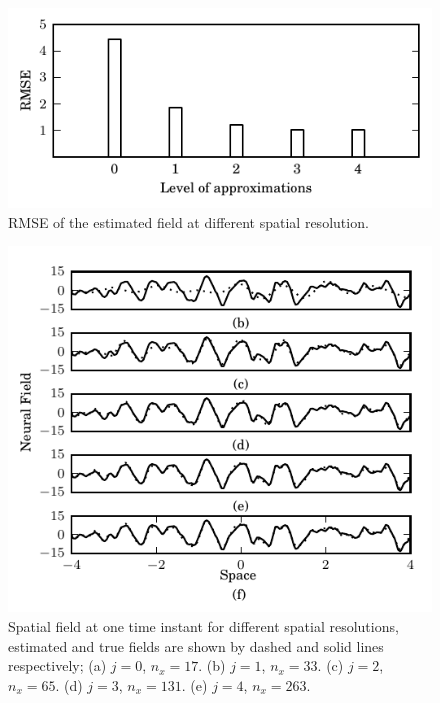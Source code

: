 \documentclass[journal,a4paper]{IEEEtran}
\begin{document}
\begin{figure}[!h] 
 \centering
\includegraphics[scale=1]{./Graph/RMSE.pdf}
 \caption{RMSE of the estimated field at different spatial resolution.}
 \label{fig:RMSE}
 \end{figure} 
\begin{figure}[!h] 
 \centering
 \includegraphics[scale=1]{./Graph/Field.pdf}
 \caption{Spatial field at one time instant for different spatial resolutions, estimated and true fields are
shown by dashed and solid lines respectively; (a) $j=0$, $n_x=17$. (b) $j=1$, $n_x=33$. (c) $j=2$, $n_x=65$. (d) $j=3$, $n_x=131$. (e) $j=4$, $n_x=263$.}
 \label{fig:FreqResponse}
 \end{figure} 
\end{document}
